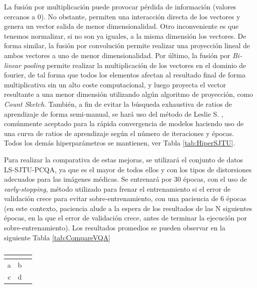 La fusión por multiplicación puede provocar pérdida de información (valores cercanos a 0). 
No obstante, permiten una interacción directa de los vectores y genera un vector salida 
de menor dimensionalidad. Otro inconveniente es que tenemos normalizar, si no son 
ya iguales, a la misma dimensión los vectores. De forma similar, la fusión por convolución 
permite realizar una proyección lineal de ambos vectores a uno de menor dimensionalidad. 
Por último, la fusión por \emph{Bi-linear pooling} permite realizar la multiplicación de 
los vectores en el dominio de fourier, de tal forma que todos los elementos afectan al 
resultado final de forma multiplicativa sin un alto coste computacional, y luego proyecta 
el vector resultante a una menor dimensión utilizando algún algoritmo de proyección, 
como \emph{Count Sketch}. También, a fin de evitar la búsqueda exhaustiva de 
ratios de aprendizaje de forma semi-manual, se hará uso del método de Leslie S. 
\cite{LeslieS}, comúnmente aceptado para la rápida convergencia de modelos 
haciendo uso de una curva de ratios de aprendizaje según el número de iteraciones 
y épocas. Todos los demás hiperparámetros se mantienen, ver Tabla \ref{tab:HiperSJTU}.

Para realizar la comparativa de estas mejoras, se utilizará el conjunto de datos 
LS-SJTU-PCQA\cite{ResSCNN}, ya que es el mayor de todos ellos y con los tipos 
de distorsiones adecuados para las imágenes médicas. Se entrenará por 30 épocas, 
con el uso de \emph{early-stopping}, método utilizado para frenar el entrenamiento 
si el error de validación crece para evitar sobre-entrenamiento, con una paciencia 
de 6 épocas (en este contexto, paciencia alude a la espera de los resultados de 
las N siguientes épocas, en la que el error de validación crece, antes de terminar 
la ejecución por sobre-entrenamiento). Los resultados promedios se pueden 
observar en la siguiente Tabla \ref{tab:CompareVQA}


\begin{table}[htp]
  \begin{center}
    \begin{tabular}[c]{|c|c|c|}
      \hline
      \multicolumn{1}{c|}{\textbf{}} & 
      \multicolumn{1}{c}{\textbf{}} \\
      \hline
      a & b \\
      c & d \\
      
      \hline
    \end{tabular}
  \end{center}
  \caption[]{}
  \label{tab:}
\end{table}
